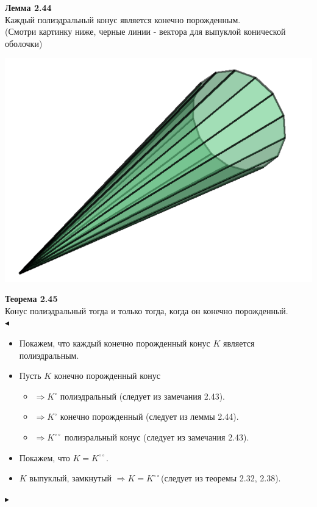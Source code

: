 \noindent\textbf{Лемма 2.44}\\
Каждый полиэдральный конус является конечно порожденным.\\
(Смотри картинку ниже, черные линии - вектора для выпуклой конической оболочки)
\begin{center}
\includegraphics[scale=0.3]{polyed.png}
\end{center}
\noindent\textbf{Теорема 2.45}\\
Конус полиэдральный тогда и только тогда, когда он конечно порожденный.\\
$\blacktriangleleft$
\begin{itemize}
\item  Покажем, что каждый конечно порожденный конус $K$ является полиэдральным.
\item Пусть $K$ конечно порожденный конус
\begin{itemize}
\item $\Longrightarrow K^{\circ}$ полиэдральный (следует из замечания 2.43).
\item $\Longrightarrow K^{\circ}$ конечно порожденный (следует из леммы 2.44).
\item $\Longrightarrow K^{\circ\circ}$ полиэральный конус (следует из замечания 2.43).
\end{itemize}
\item Покажем, что $K=K^{\circ\circ}$.
\item $K$ выпуклый, замкнутый $\Longrightarrow K=K^{\circ\circ}$(следует из теоремы 2.32, 2.38).
\end{itemize}
$\blacktriangleright$

